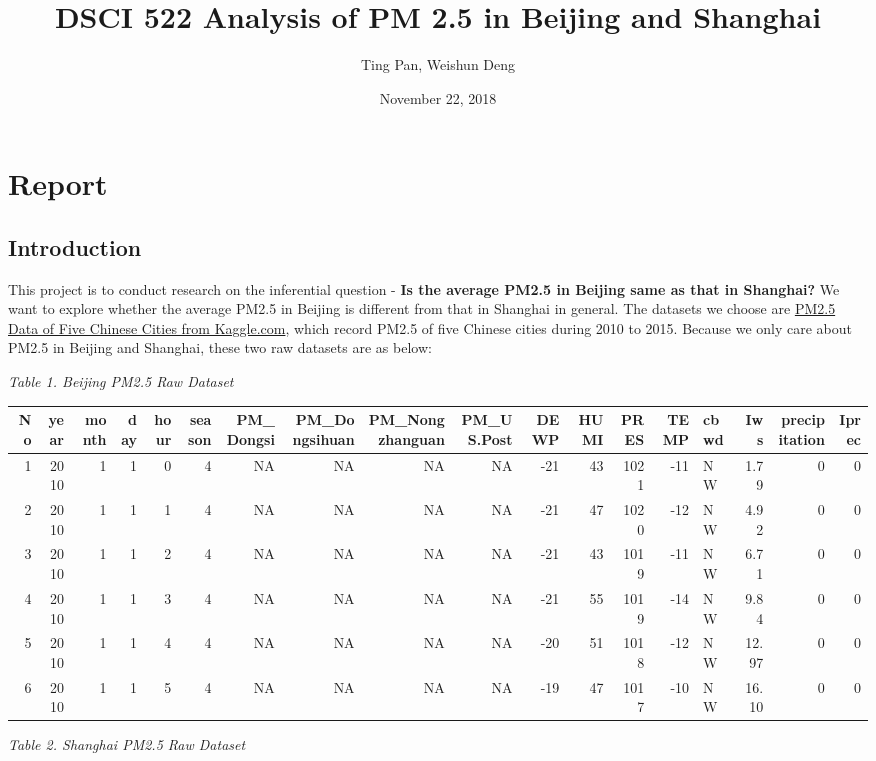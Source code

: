 \documentclass[]{article}
\title{DSCI 522 Analysis of PM 2.5 in Beijing and Shanghai}
\author{Ting Pan, Weishun Deng}
\date{November 22, 2018}
\begin{document}
\maketitle

\section{Report}\label{report}

\subsection{Introduction}\label{introduction}

This project is to conduct research on the inferential question -
\textbf{Is the average PM2.5 in Beijing same as that in Shanghai?} We
want to explore whether the average PM2.5 in Beijing is different from
that in Shanghai in general. The datasets we choose are
\href{https://www.kaggle.com/uciml/pm25-data-for-five-chinese-cities}{PM2.5
Data of Five Chinese Cities from Kaggle.com}, which record PM2.5 of five
Chinese cities during 2010 to 2015. Because we only care about PM2.5 in
Beijing and Shanghai, these two raw datasets are as below:

\emph{Table 1. Beijing PM2.5 Raw Dataset}

\begin{longtable}[]{@{}rrrrrrrrrrrrrrlrrr@{}}
\toprule
No & year & month & day & hour & season & PM\_Dongsi & PM\_Dongsihuan &
PM\_Nongzhanguan & PM\_US.Post & DEWP & HUMI & PRES & TEMP & cbwd & Iws
& precipitation & Iprec\tabularnewline
\midrule
\endhead
1 & 2010 & 1 & 1 & 0 & 4 & NA & NA & NA & NA & -21 & 43 & 1021 & -11 &
NW & 1.79 & 0 & 0\tabularnewline
2 & 2010 & 1 & 1 & 1 & 4 & NA & NA & NA & NA & -21 & 47 & 1020 & -12 &
NW & 4.92 & 0 & 0\tabularnewline
3 & 2010 & 1 & 1 & 2 & 4 & NA & NA & NA & NA & -21 & 43 & 1019 & -11 &
NW & 6.71 & 0 & 0\tabularnewline
4 & 2010 & 1 & 1 & 3 & 4 & NA & NA & NA & NA & -21 & 55 & 1019 & -14 &
NW & 9.84 & 0 & 0\tabularnewline
5 & 2010 & 1 & 1 & 4 & 4 & NA & NA & NA & NA & -20 & 51 & 1018 & -12 &
NW & 12.97 & 0 & 0\tabularnewline
6 & 2010 & 1 & 1 & 5 & 4 & NA & NA & NA & NA & -19 & 47 & 1017 & -10 &
NW & 16.10 & 0 & 0\tabularnewline
\bottomrule
\end{longtable}

\emph{Table 2. Shanghai PM2.5 Raw Dataset}
\end{document}
